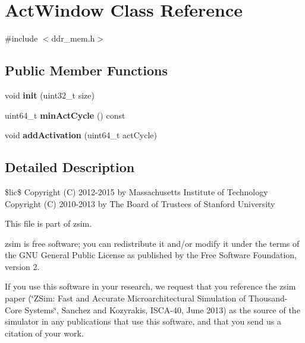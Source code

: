 \hypertarget{classActWindow}{\section{Act\-Window Class Reference}
\label{classActWindow}
}


{\ttfamily \#include $<$ddr\-\_\-mem.\-h$>$}

\subsection*{Public Member Functions}
\begin{DoxyCompactItemize}
\item 
\hypertarget{classActWindow_a225548b760e388e0b6973c1186b341cc}{void {\bfseries init} (uint32\-\_\-t size)}\label{classActWindow_a225548b760e388e0b6973c1186b341cc}

\item 
\hypertarget{classActWindow_a3727d383d4d5a32afdf1f12ba9674a0a}{uint64\-\_\-t {\bfseries min\-Act\-Cycle} () const }\label{classActWindow_a3727d383d4d5a32afdf1f12ba9674a0a}

\item 
\hypertarget{classActWindow_a062fcd84cef712aa8c05cc7078d3ed06}{void {\bfseries add\-Activation} (uint64\-\_\-t act\-Cycle)}\label{classActWindow_a062fcd84cef712aa8c05cc7078d3ed06}

\end{DoxyCompactItemize}


\subsection{Detailed Description}
\$lic\$ Copyright (C) 2012-\/2015 by Massachusetts Institute of Technology Copyright (C) 2010-\/2013 by The Board of Trustees of Stanford University

This file is part of zsim.

zsim is free software; you can redistribute it and/or modify it under the terms of the G\-N\-U General Public License as published by the Free Software Foundation, version 2.

If you use this software in your research, we request that you reference the zsim paper (\char`\"{}\-Z\-Sim\-: Fast and Accurate Microarchitectural Simulation of
\-Thousand-\/\-Core Systems\char`\"{}, Sanchez and Kozyrakis, I\-S\-C\-A-\/40, June 2013) as the source of the simulator in any publications that use this software, and that you send us a citation of your work.

